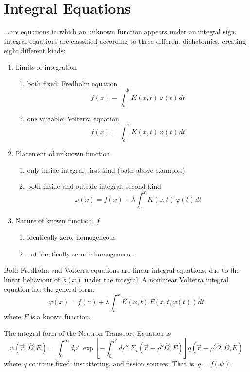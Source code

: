 \documentclass[12pt]{article}
\newcommand{\rvec}{\ensuremath{\vec{r}}}
\newcommand{\vOmega}{\ensuremath{\hat{\Omega}}}
\begin{document}
\section{Integral Equations}
...are equations in which an unknown function appears under an integral sign.
Integral equations are classified according to three different dichotomies, creating eight different kinds:
\begin{enumerate}
\item Limits of integration
  \begin{enumerate}
  \item both fixed: Fredholm equation
    \[f(x)=\int _{a}^{b}K(x,t)\,\varphi (t)\,dt\]
  \item one variable: Volterra equation
    \[f(x)=\int _{a}^{x}K(x,t)\,\varphi (t)\,dt\]
  \end{enumerate}

\item Placement of unknown function
  \begin{enumerate}
  \item only inside integral: first kind (both above examples)
  \item both inside and outside integral: second kind
    \[\varphi (x)=f(x)+\lambda \int _{a}^{x}K(x,t)\,\varphi (t)\,dt\]
  \end{enumerate}

\item Nature of known function, $f$
  \begin{enumerate}
  \item identically zero: homogeneous
  \item not identically zero: inhomogeneous
  \end{enumerate}
\end{enumerate}
Both Fredholm and Volterra equations are linear integral equations, due to the linear behaviour of $\phi(x)$ under the integral. 
A nonlinear Volterra integral equation has the general form:
\[ \varphi (x)=f(x)+\lambda \int _{a}^{x}K(x,t)\,F(x,t,\varphi (t))\,dt\]
where $F$ is a known function.

The integral form of the Neutron Transport Equation is
\[
\psi(\rvec, \vOmega, E) =\int_0^{\infty} d\rho' \:\exp[-\int_0^{\rho'} d\rho'' \: \Sigma_t(\rvec-\rho''\vOmega,E)]q(\rvec-\rho'\vOmega,\vOmega,E)\]
where $q$ contains fixed, inscattering, and fission sources. That is, $q = f(\psi)$.
\end{document}
